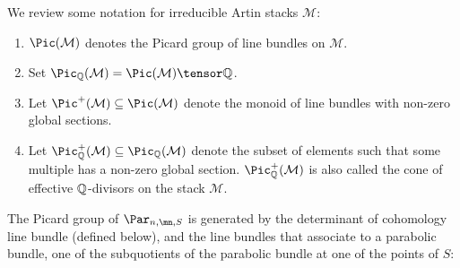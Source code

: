  \begin{defi}
\notready
We review some notation for irreducible Artin stacks $\mathcal{M}$:
\begin{enumerate}
\item $\Pic(\mathcal{M})$ denotes the Picard group of line bundles on $\mathcal{M}$.
\item Set $\Pic_{\Bbb{Q}}(\mathcal{M})=\Pic(\mathcal{M})\tensor\Bbb{Q}$.
\item Let $\Pic^+(\mathcal{M})\subseteq \Pic(\mathcal{M})$ denote the monoid of line bundles with non-zero global sections.
\item Let $\Pic^+_{\Bbb{Q}}(\mathcal{M})\subseteq \Pic_{\Bbb{Q}}(\mathcal{M})$ denote the subset of elements such that some multiple has a non-zero global section. $\Pic^+_{\Bbb{Q}}(\mathcal{M})$ is also called the cone of effective $\Bbb{Q}$-divisors on the stack $\mathcal{M}$.
\end{enumerate}
\end{defi}
The Picard group of $\Par_{n,\mn,S}$ is generated by the determinant of cohomology line bundle (defined below), and the line bundles that associate to a parabolic bundle, one of the subquotients of the parabolic bundle at one of the points of $S$:

